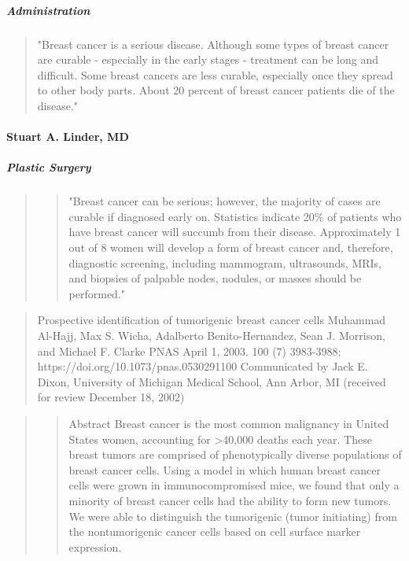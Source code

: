 \documentclass[11pt]{article}
\begin{document}
\subparagraph{Administration}\label{administration}

\begin{quote}
"Breast cancer is a serious disease. Although some types of breast
cancer are curable - especially in the early stages - treatment can be
long and difficult. Some breast cancers are less curable, especially
once they spread to other body parts. About 20 percent of breast cancer
patients die of the disease."
\end{quote}

    \paragraph{Stuart A. Linder, MD}\label{stuart-a.-linder-md}

\subparagraph{Plastic Surgery}\label{plastic-surgery}

\begin{quote}
\begin{quote}
"Breast cancer can be serious; however, the majority of cases are
curable if diagnosed early on. Statistics indicate 20\% of patients who
have breast cancer will succumb from their disease. Approximately 1 out
of 8 women will develop a form of breast cancer and, therefore,
diagnostic screening, including mammogram, ultrasounds, MRIs, and
biopsies of palpable nodes, nodules, or masses should be performed."
\end{quote}
\end{quote}

    \begin{quote}
Prospective identification of tumorigenic breast cancer cells Muhammad
Al-Hajj, Max S. Wicha, Adalberto Benito-Hernandez, Sean J. Morrison, and
Michael F. Clarke PNAS April 1, 2003. 100 (7) 3983-3988;
https://doi.org/10.1073/pnas.0530291100 Communicated by Jack E. Dixon,
University of Michigan Medical School, Ann Arbor, MI (received for
review December 18, 2002)
\end{quote}

\begin{quote}
\begin{quote}
Abstract Breast cancer is the most common malignancy in United States
women, accounting for \textgreater{}40,000 deaths each year. These
breast tumors are comprised of phenotypically diverse populations of
breast cancer cells. Using a model in which human breast cancer cells
were grown in immunocompromised mice, we found that only a minority of
breast cancer cells had the ability to form new tumors. We were able to
distinguish the tumorigenic (tumor initiating) from the nontumorigenic
cancer cells based on cell surface marker expression.
\end{quote}
\end{quote}
\end{document}
